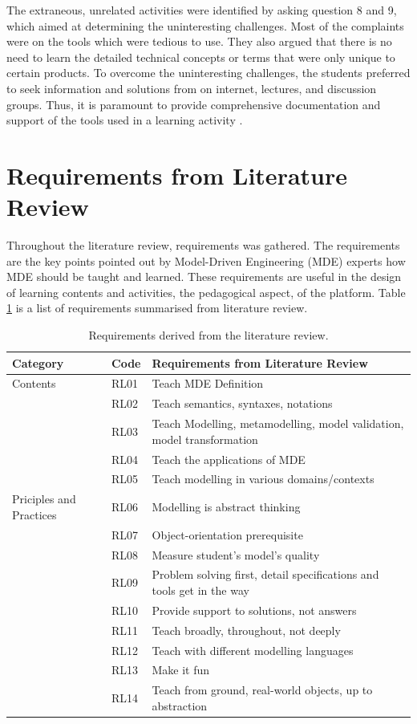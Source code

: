 \documentclass[12pt, a4paper]{report} \usepackage[titletoc]{appendix}
\begin{document}
\begin{appendices}
The extraneous, unrelated activities were identified by asking question 8 and 9, which aimed at determining the uninteresting challenges. Most of the complaints were on the tools which were tedious to use. They also argued that there is no need to learn the detailed technical concepts or terms that were only unique to certain products. To overcome the uninteresting challenges, the students preferred to seek information and solutions from on internet, lectures, and discussion groups. Thus, it is paramount to provide comprehensive documentation and support of the tools used in a learning activity \cite{liebel2015ready}. 

\section{Requirements from Literature Review}
\label{Requirements from Literature Review}
Throughout the literature review, requirements was gathered. The requirements are the key points pointed out by Model-Driven Engineering (MDE) experts how MDE should be taught and learned. These requirements are useful in the design of learning contents and activities, the pedagogical aspect, of the platform. Table \ref{table:requirements} is a list of requirements summarised from literature review. 

\begin{table}[ht]\caption{Requirements derived from the literature review.}
\label{table:requirements}
\begin{center}
\begin{tabular}{ p{2cm}p{1cm}p{10cm} } 
\hline
Category & Code & Requirements from Literature Review \\
\hline
\multirow{1}{2cm}{Contents} 
& RL01 & Teach MDE Definition \\ 
& RL02 & Teach semantics, syntaxes, notations \\ 
& RL03 & Teach Modelling, metamodelling, model validation, model transformation\\
& RL04 & Teach the applications of MDE \\
& RL05 & Teach modelling in various domains/contexts \\

\hline
\multirow{1}{2cm}{Priciples and Practices} 
& RL06 & Modelling is abstract thinking \\ 
& RL07 & Object-orientation prerequisite \\
& RL08 & Measure student's model's quality \\
& RL09 & Problem solving first, detail specifications and tools get in the way \\
& RL10 & Provide support to solutions, not answers \\ 
& RL11 & Teach broadly, throughout, not deeply \\
& RL12 & Teach with different modelling languages \\ 
& RL13 & Make it fun \\ 
& RL14 & Teach from ground, real-world objects, up to abstraction \\ 


\end{tabular}
\end{center}
\end{table}
\end{appendices}
\end{document}
